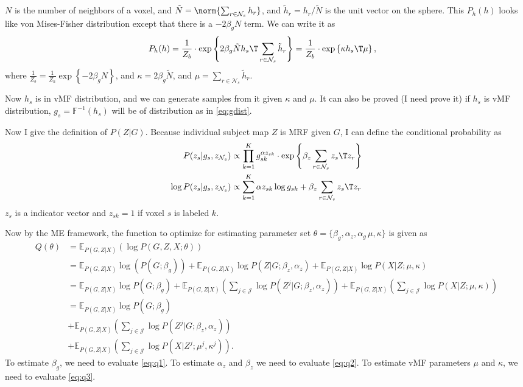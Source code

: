\documentclass{article}
\begin{document}
$N$ is the number of neighbors of a voxel, and $\tilde N = \norm{ \sum_{r \in \mathcal{N}_s} h_r}$, and $\tilde h_r = h_r/\tilde N$ is the unit vector on the sphere. This $P_h(h)$ looks like von Mises-Fisher distribution except that there is a $-2\beta_g N $ term. We can write it as
\begin{align}
P_h(h)  &= \frac{1}{Z_b}  \cdot \exp \left \{ 2\beta_g \tilde N h_s\T \sum_{r \in \mathcal{N}_s}\tilde h_r \right \} = \frac{1}{Z_b}  \cdot \exp \left \{\kappa h_s\T \mu \right \},\label{eq:vmfh}
\end{align}
where $\frac{1}{Z_b} = \frac{1}{Z_h} \exp \left \{ -2 \beta_g N \right \}$, and $ \kappa = 2\beta_g \tilde N$, and $\mu = \sum_{r \in \mathcal{N}_s}\tilde h_r$. 

Now $h_s$ is in vMF distribution, and we can generate samples from it given $\kappa$ and $\mu$. It can also be proved (I need prove it) if $h_s$ is vMF distribution, $g_s = \mathbb{F}^{-1}(h_s)$ will be of distribution as in \eqref{eq:gdist}.

Now I give the definition of $P(Z | G)$. Because individual subject map $Z$ is MRF given $G$, I can define the conditional probability as
\begin{align*}
  P(z_s | g_s, z_{\mathcal{N}_s}) &\propto \prod_{k=1}^K g_{sk}^{\alpha z_{sk}} \cdot \exp \left \{ \beta_z \sum_{r \in \mathcal{N}_s} z_s\T z_r \right \} \\
  \log P(z_s | g_s, z_{\mathcal{N}_s}) &\propto \sum_{k=1}^K \alpha z_{sk} \log g_{sk} + \beta_z  \sum_{r \in \mathcal{N}_s} z_s\T z_r
\end{align*}
$z_s$ is a indicator vector and $z_{sk} = 1$ if voxel $s$ is labeled $k$.

Now by the ME framework, the function to optimize for estimating parameter set $\theta = \{ \beta_g, \alpha_z, \alpha_g\, \mu, \kappa\}$  is given as
\begin{align} 
  Q(\theta) &= \mathbb{E}_{P(G, Z|X)} \left (\log P(G, Z, X;\theta) \right ) \nonumber\\
  &= \mathbb{E}_{P(G, Z|X)} \log \left ( P(G;\beta_g) \right ) + \mathbb{E}_{P(G, Z|X)} \log P(Z|G; \beta_z, \alpha_z) + \mathbb{E}_{P(G, Z|X)} \log P(X|Z;\mu, \kappa) \nonumber\\
  &= \mathbb{E}_{P(G, Z|X)} \log  P(G;\beta_g) + \mathbb{E}_{P(G, Z|X)} \left (\sum_{j\in \mathcal{J}}\log P(Z^j|G; \beta_z, \alpha_z) \right ) + \mathbb{E}_{P(G, Z|X)} \left (\sum_{j\in \mathcal{J}}\log P(X|Z;\mu, \kappa) \right ) \nonumber\\
  &= \mathbb{E}_{P(G, Z|X)} \log  P(G;\beta_g) \label{eq:q1}\\
  & + \mathbb{E}_{P(G, Z|X)} \left (\sum_{j\in \mathcal{J}}\log P(Z^j|G; \beta_z, \alpha_z) \right ) \label{eq:q2}\\
  & + \mathbb{E}_{P(G, Z|X)} \left (\sum_{j\in \mathcal{J}}\log P(X|Z^j;\mu^j, \kappa^j) \right ) \label{eq:q3}.
\end{align}
To estimate $\beta_g$, we need to evaluate \eqref{eq:q1}. To estimate $\alpha_z$ and $\beta_z$ we need to evaluate \eqref{eq:q2}. To estimate vMF parameters $\mu$ and $\kappa$, we need to evaluate \eqref{eq:q3}.
\end{document}
